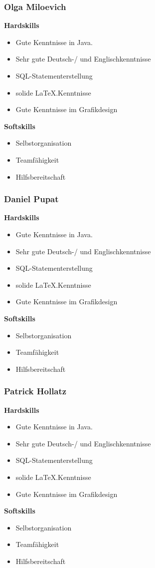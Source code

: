 \documentclass[fontsize=12pt,paper=a4,twoside]{scrartcl}
\begin{document}
\subsubsection{Olga Miloevich}

\textbf{Hardskills}
\begin{itemize}
\item{Gute Kenntnisse in Java.}
\item{Sehr gute Deutsch-/ und Englischkenntnisse}
\item{SQL-Statementerstellung}
\item{solide \LaTeX.Kenntnisse}
\item{Gute Kenntnisse im Grafikdesign}
\end{itemize}
\textbf{Softskills}
\begin{itemize}
\item{Selbstorganisation}
\item{Teamfähigkeit}
\item{Hilfsbereitschaft}
\end{itemize}

\subsubsection{Daniel Pupat}

\textbf{Hardskills}
\begin{itemize}
\item{Gute Kenntnisse in Java.}
\item{Sehr gute Deutsch-/ und Englischkenntnisse}
\item{SQL-Statementerstellung}
\item{solide \LaTeX.Kenntnisse}
\item{Gute Kenntnisse im Grafikdesign}
\end{itemize}
\textbf{Softskills}
\begin{itemize}
\item{Selbstorganisation}
\item{Teamfähigkeit}
\item{Hilfsbereitschaft}
\end{itemize}

\subsubsection{Patrick Hollatz}

\textbf{Hardskills}
\begin{itemize}
\item{Gute Kenntnisse in Java.}
\item{Sehr gute Deutsch-/ und Englischkenntnisse}
\item{SQL-Statementerstellung}
\item{solide \LaTeX.Kenntnisse}
\item{Gute Kenntnisse im Grafikdesign}
\end{itemize}
\textbf{Softskills}
\begin{itemize}
\item{Selbstorganisation}
\item{Teamfähigkeit}
\item{Hilfsbereitschaft}
\end{itemize}
\end{document}
